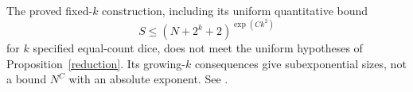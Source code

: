 \documentclass[11pt]{article}
\begin{document}
The proved fixed-$k$ construction, including its uniform quantitative
bound
\[
 S\le(N+2^k+2)^{\exp(Ck^2)}
\]
for $k$ specified equal-count dice, does not meet the uniform hypotheses
of Proposition~\ref{reduction}. Its growing-$k$ consequences give
subexponential sizes, not a bound $N^C$ with an absolute exponent.
See .
\end{document}
